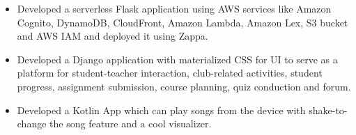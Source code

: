 \begin{justify}


\begin{itemize}
  \item Developed a serverless Flask application using AWS services like Amazon Cognito, DynamoDB, CloudFront, Amazon Lambda, Amazon Lex, S3 bucket and AWS IAM and deployed it using Zappa.
\end{itemize}
\medskip



\begin{itemize}
  \item Developed a Django application with materialized CSS for UI to serve as a platform for student-teacher interaction, club-related activities, student progress, assignment submission, course planning, quiz conduction and forum.
\end{itemize}
\medskip



\begin{itemize}
  \item Developed a Kotlin App which can play songs from the device with shake-to-change the song feature and a cool visualizer.
\end{itemize}
\medskip








\end{justify}
